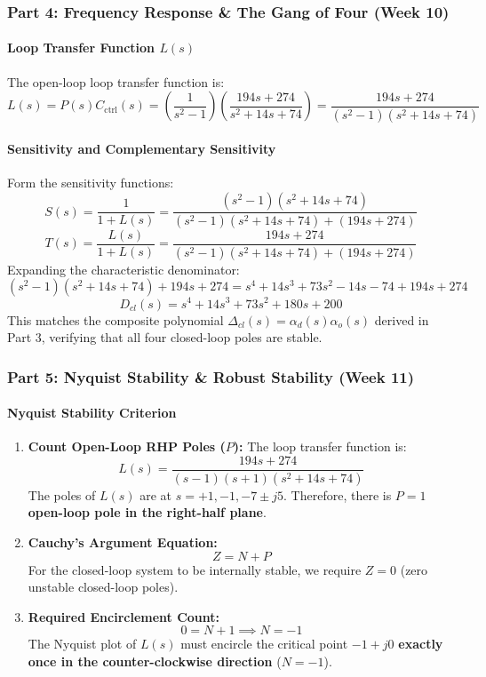 \documentclass[12pt,onecolumn,twoside ]{article}
\begin{document}
	\subsubsection{Part 4: Frequency Response \& The Gang of Four (Week 10)}
	\paragraph{Loop Transfer Function $L(s)$}
	The open-loop loop transfer function is: \[
	L(s) = P(s)C_{\text{ctrl}}(s) = \left( \frac{1}{s^2 - 1} \right) \left( \frac{194s + 274}{s^2 + 14s + 74} \right) = \frac{194s + 274}{(s^2 - 1)(s^2 + 14s + 74)}
	\]
	\paragraph{Sensitivity and Complementary Sensitivity}
	Form the sensitivity functions: \[
	S(s) = \frac{1}{1 + L(s)} = \frac{(s^2 - 1)(s^2 + 14s + 74)}{(s^2 - 1)(s^2 + 14s + 74) + (194s + 274)}
	\] \[
	T(s) = \frac{L(s)}{1 + L(s)} = \frac{194s + 274}{(s^2 - 1)(s^2 + 14s + 74) + (194s + 274)}
	\]
	Expanding the characteristic denominator: \[
	(s^2 - 1)(s^2 + 14s + 74) + 194s + 274 = s^4 + 14s^3 + 73s^2 - 14s - 74 + 194s + 274
	\] \[
	D_{cl}(s) = s^4 + 14s^3 + 73s^2 + 180s + 200
	\]
	This matches the composite polynomial $\Delta_{cl}(s) = \alpha_d(s)\alpha_o(s)$ derived in Part 3, verifying that all four closed-loop poles are stable.
	
	\subsubsection{Part 5: Nyquist Stability \& Robust Stability (Week 11)}
	\paragraph{Nyquist Stability Criterion}
	\begin{enumerate}
		\item
		\textbf{Count Open-Loop RHP Poles ($P$):} The loop transfer function is: \[
		L(s) = \frac{194s + 274}{(s - 1)(s + 1)(s^2 + 14s + 74)}
		\] The poles of $L(s)$ are at $s = +1, -1, -7 \pm j5$. Therefore, there is \textbf{$P = 1$ open-loop pole in the right-half plane}.
		\item
		\textbf{Cauchy's Argument Equation:} \[
		Z = N + P
		\] For the closed-loop system to be internally stable, we require \textbf{$Z = 0$} (zero unstable closed-loop poles).
		\item
		\textbf{Required Encirclement Count:} \[
		0 = N + 1 \implies N = -1
		\] The Nyquist plot of $L(s)$ must encircle the critical point $-1 + j0$ \textbf{exactly once in the counter-clockwise direction} ($N = -1$).
	\end{enumerate}
\end{document}
